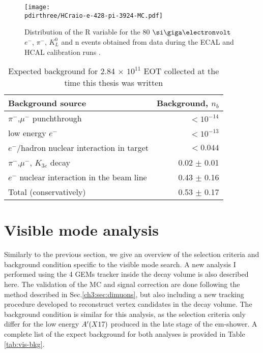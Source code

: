 \begin{figure}[bht!]
  \centering
  \texttt{[image: \\pdirthree/HCraio-e-428-pi-3924-MC.pdf]}
  \caption[R value comparison]{Distribution of the R variable for the 80 $\gev$ $e^-$, $\pi^-$, $K_L^0$ and n events obtained from data during the ECAL and HCAL calibration runs \cite{Banerjee:2020fue}.}
  \label{fig:R-comp}
\end{figure}

\begin{table}[bth!]
  \centering
  \caption[Invisible mode background]{Expected background for 2.84 $\times$ $10^{11}$ EOT collected at the time this thesis was written \cite{NA64:2019imj}}
  \begin{tabular}{lr}
    \hline \hline
    Background source & Background, $n_b$ \\
    \hline
    $\pi^-$,$\mu^-$ punchthrough                      & $<10^{-14}$ \\
    low energy $e^-$                                  & $<10^{-13}$ \\
    $e^-$/hadron nuclear interaction in target        & $<0.044$   \\
    $\pi^-$,$\mu^-$, $K_{3e}$ decay                    & 0.02 $\pm$ 0.01 \\
    $e^-$ nuclear interaction in the  beam line       & 0.43 $\pm$ 0.16 \\
    \hline
    Total (conservatively)                            & 0.53 $\pm$ 0.17 \\
    \hline \hline                       
  \end{tabular}
  \label{tab:inv-bkg}
\end{table}



\section{Visible mode analysis}
\label{ch3:sec:analysis-vis}

Similarly to the previous section, we give an overview of the selection criteria and background condition specific to the visible mode search. A new analysis I performed using the 4 GEMs tracker inside the decay volume is also described here. The validation of the MC and signal correction are done following the method described in Sec.\ref{ch3:sec:dimuons}, but also including a new tracking procedure developed to reconstruct vertex candidates in the decay volume. The background condition is similar for this analysis, as the selection criteria only differ for the low energy $A'(X17)$ produced in the late stage of the em-shower. A complete list of the expect background for both analyses is provided in Table \ref{tab:vis-bkg}.


